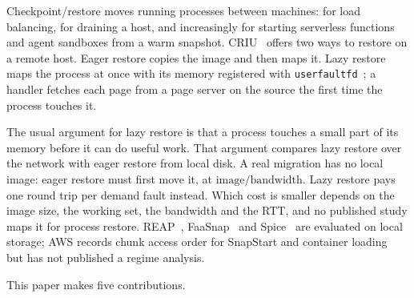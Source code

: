 \documentclass[conference]{IEEEtran}
\newcommand{\uffd}{\texttt{userfaultfd}\xspace}
\begin{document}
Checkpoint/restore moves running processes between machines: for load
balancing, for draining a host, and increasingly for starting serverless
functions and agent sandboxes from a warm snapshot. CRIU~\cite{criu} offers
two ways to restore on a remote host. Eager restore copies the image and then
maps it. Lazy restore~\cite{criu-lazy} maps the process at once with its
memory registered with \uffd~\cite{userfaultfd}; a handler fetches each page
from a page server on the source the first time the process touches it.

The usual argument for lazy restore is that a process touches a small part of
its memory before it can do useful work. That argument compares lazy restore
over the network with eager restore from local disk. A real migration has no
local image: eager restore must first move it, at
$\text{image}/\text{bandwidth}$. Lazy restore pays one round trip per demand
fault instead. Which cost is smaller depends on the image size, the working
set, the bandwidth and the RTT, and no published study maps it for process
restore. REAP~\cite{ustiugov2021reap}, FaaSnap~\cite{ao2022faasnap} and
Spice~\cite{holmes2025spice} are evaluated on local storage; AWS records chunk
access order for SnapStart and container loading~\cite{snapstart,
brooker2023ondemand} but has not published a regime analysis.

This paper makes five contributions.
\end{document}
